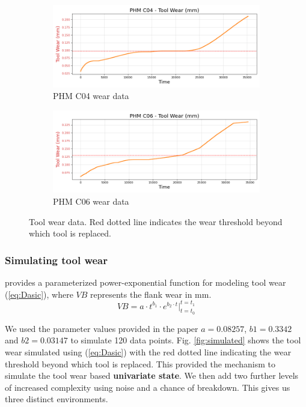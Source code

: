 \documentclass[a4paper, 12pt]{article}
\begin{document}
\begin{figure}[ht]
	\begin{subfigure}[b]{0.5\textwidth}
		\centering
		\includegraphics[width=\textwidth]{PHM_C04_wear_plot.png}  
		\caption{PHM C04 wear data}
		\label{fig:C04}
	\end{subfigure}
	\hfill
	\begin{subfigure}[b]{0.5\textwidth}
		\centering
		\includegraphics[width=\textwidth]{PHM_C06_wear_plot.png}  
		\caption{PHM C06 wear data}
		\label{fig:C06}
	\end{subfigure} 
	\label{fig:tool wear-plots}
	\caption{Tool wear data. Red dotted line indicates the wear threshold beyond which tool is replaced.}
\end{figure}

\subsubsection*{Simulating tool wear}
\cite{dasic2006} provides a parameterized power-exponential function for modeling tool wear (\ref{eq:Dasic}), where $VB$ represents the flank wear in mm.
\begin{equation}
	VB = a \cdot t^{b_1} \cdot e^{b_2 \cdot t} \Big|_{t=t_0}^{t=t_1}
	\label{eq:Dasic}
\end{equation}

We used the parameter values provided in the paper $a=0.08257$, $b1=0.3342$ and $b2=0.03147$ to simulate 120 data points. Fig. \ref{fig:simulated} shows the tool wear simulated using (\ref{eq:Dasic}) with the red dotted line indicating the wear threshold beyond which tool is replaced. This provided the mechanism to simulate the tool wear based \textbf{univariate state}. We then add two further levels of increased complexity using noise and a chance of breakdown. This gives us three distinct environments. 
\end{document}
